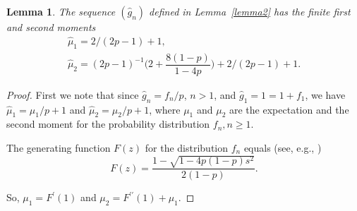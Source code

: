 \documentclass[numbers,compress,v1.0.1]{vmsta}
\newtheorem{lemma}{Lemma}
\theoremstyle{definition}
\begin{document}
\begin{lemma}\label{lemma3}
The sequence $(\hat g_n)$ defined in Lemma~\ref{lemma2} has the finite
first and second moments
%
\begin{equation}
%
\begin{array}{c}
\hat\mu_1 = 2/(2p-1) + 1 ,\\[3pt]
\hat\mu_2 = (2p-1)^{-1} \biggl( 2 + \dfrac{8(1-p)}{1-4p} \biggr) + 2/(2p-1) + 1.
\end{array} %
\end{equation}
%
\end{lemma}

\begin{proof}
First we note that since $\hat g_n = f_n/p$, $n>1$, and $\hat g_1 = 1
= 1+f_1$, we have $\hat\mu_1 = \mu_1/p +1$ and $\hat\mu_2 = \mu_{2}/p
+1$, where
$\mu_1$ and $\mu_2$ are the expectation and the second moment for the
probability distribution $f_n, n\ge1$.

The generating function $F(z)$ for the distribution $f_n$ equals
(see, e.g., \cite[Ch.~XIII]{Feller})
%
\begin{equation}
F(z) = \frac{1-\sqrt{1-4p(1-p)s^2}}{2(1-p)}.
\end{equation}

So, $ \mu_1 = F^\prime(1)$ and $\mu_2 = F^{\prime\prime}(1) + \mu_1$.
\end{proof}

\appendix

%
%
%
\end{document}
